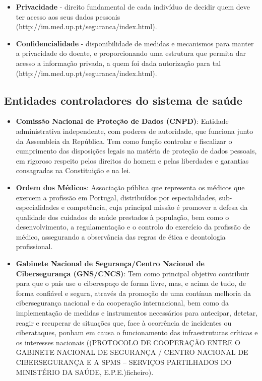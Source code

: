 \documentclass{article}
\begin{document}
\begin{multicols}{2}
\begin{itemize}
	\item \textbf{Privacidade} - direito fundamental de cada indivíduo de decidir quem deve ter acesso aos seus dados pessoais (http://im.med.up.pt/seguranca/index.html).
	
	\item \textbf{Confidencialidade} - disponibilidade de medidas e mecanismos para manter a privacidade do doente, e proporcionando uma estrutura que permita dar acesso a informação privada, a quem foi dada autorização para tal (http://im.med.up.pt/seguranca/index.html).
	
\end{itemize}

\subsection{Entidades controladores do sistema de saúde}

\begin{itemize}

	\item \textbf{Comissão Nacional de Proteção de Dados (CNPD)}: Entidade administrativa independente, com poderes de autoridade, que funciona junto da Assembleia da República. Tem como função controlar e fiscalizar o cumprimento das disposições legais na matéria de proteção de dados pessoais, em rigoroso respeito pelos direitos do homem e pelas liberdades e garantias consagradas na Constituição e na lei.
	
	\item \textbf{Ordem dos Médicos}: Associação pública que representa os médicos que exercem a profissão em Portugal, distribuídos por especialidades, sub-especialidades e competência, cuja principal missão é promover a defesa da qualidade dos cuidados de saúde prestados à população, bem como o desenvolvimento, a regulamentação e o controlo do exercício da profissão de médico, assegurando a observância das regras de ética e deontologia profissional.
	
	\item \textbf{Gabinete Nacional de Segurança/Centro Nacional de Cibersegurança (GNS/CNCS)}: Tem como principal objetivo contribuir para que o país use o ciberespaço de forma livre, mas, e acima de tudo, de forma confiável e segura, através da promoção de uma contínua melhoria da cibersegurança nacional e da cooperação internacional, bem como da implementação de medidas e instrumentos necessários para antecipar, detetar, reagir e recuperar de situações que, face à ocorrência de incidentes ou ciberataques, ponham em causa o funcionamento das infraestruturas críticas e os interesses nacionais ((PROTOCOLO DE COOPERAÇÃO ENTRE O  GABINETE NACIONAL DE SEGURANÇA / CENTRO NACIONAL DE CIBERSEGURANÇA E A SPMS – SERVIÇOS PARTILHADOS DO MINISTÉRIO DA SAÚDE, E.P.E.)ficheiro).
	

\end{itemize}
\end{multicols}
\end{document}
